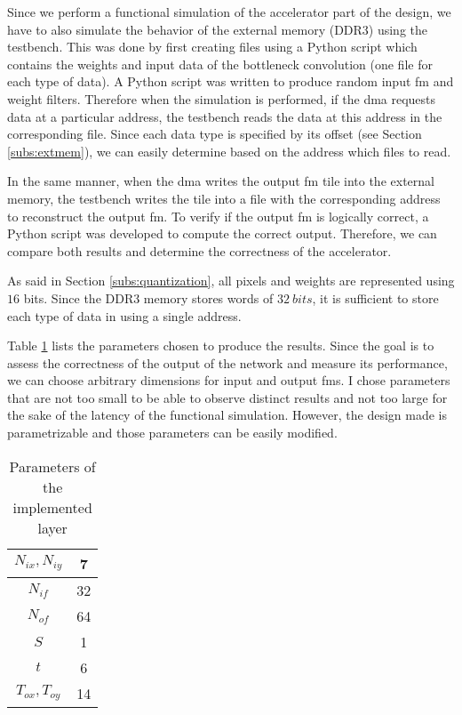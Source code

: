 Since we perform a functional simulation of the accelerator part of the design, we have to also simulate the behavior of the external memory (DDR3) using the testbench. This was done by first creating files using a Python script which contains the weights and input data of the bottleneck convolution (one file for each type of data). A Python script was written to produce random input \acrshort{fm} and weight filters. Therefore when the simulation is performed, if the \acrshort{dma} requests data at a particular address, the testbench reads the data at this address in the corresponding file. Since each data type is specified by its offset (see Section \ref{subs:extmem}), we can easily determine based on the address which files to read.

In the same manner, when the \acrshort{dma} writes the output \acrshort{fm} tile into the external memory, the testbench writes the tile into a file with the corresponding address to reconstruct the output \acrshort{fm}. To verify if the output \acrshort{fm} is logically correct, a Python script was developed to compute the correct output. Therefore, we can compare both results and determine the correctness of the accelerator.

As said in Section \ref{subs:quantization}, all pixels and weights are represented using $16$ bits. Since the DDR3 memory stores words of $32 \ bits$, it is sufficient to store each type of data in using a single address.

Table \ref{tab:param} lists the parameters chosen to produce the results. Since the goal is to assess the correctness of the output of the network and measure its performance, we can choose arbitrary dimensions for input and output \acrshort{fm}s. I chose parameters that are not too small to be able to observe distinct results and not too large for the sake of the latency of the functional simulation. However, the design made is parametrizable and those parameters can be easily modified.
%
\begin{table}[H]
    \centering
    \begin{tabular}{|c|c|}
    \hline
    $N_{ix}, N_{iy}$ & 7 \\
    \hline
    $N_{if} $ & 32 \\
    \hline
    $N_{of}$ & 64 \\
    \hline
    $S$ & 1\\
    \hline
    $t$ & 6 \\
    \hline
    $T_{ox}, T_{oy}$ & 14 \\
    \hline
    \end{tabular}
    \caption{Parameters of the implemented layer}
    \label{tab:param}
\end{table}
%
